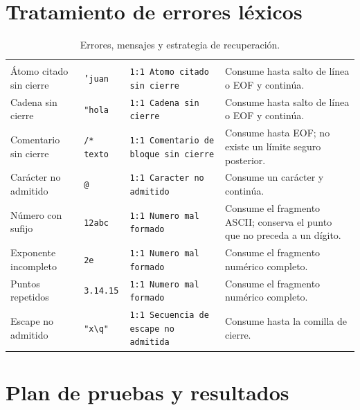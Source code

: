 \section{Tratamiento de errores léxicos}

\begin{longtable}{L{3.2cm}L{2.3cm}L{4.7cm}L{4.5cm}}
\caption{Errores, mensajes y estrategia de recuperación.}\label{tab:errores}\\
\toprule
{} &  &  &  \\
\midrule
\endfirsthead
\toprule
{} &  &  &  \\
\midrule
\endhead
Átomo citado sin cierre & \texttt{'juan} & \texttt{1:1 Atomo citado sin cierre} & Consume hasta salto de línea o EOF y continúa. \\
 Cadena sin cierre & \texttt{"hola} & \texttt{1:1 Cadena sin cierre} & Consume hasta salto de línea o EOF y continúa. \\
Comentario sin cierre & \verb|/* texto| & \texttt{1:1 Comentario de bloque sin cierre} & Consume hasta EOF; no existe un límite seguro posterior. \\
 Carácter no admitido & \texttt{@} & \texttt{1:1 Caracter no admitido} & Consume un carácter y continúa. \\
Número con sufijo & \texttt{12abc} & \texttt{1:1 Numero mal formado} & Consume el fragmento ASCII; conserva el punto que no preceda a un dígito. \\
 Exponente incompleto & \texttt{2e} & \texttt{1:1 Numero mal formado} & Consume el fragmento numérico completo. \\
Puntos repetidos & \texttt{3.14.15} & \texttt{1:1 Numero mal formado} & Consume el fragmento numérico completo. \\
 Escape no admitido & \verb|"x\q"| & \texttt{1:1 Secuencia de escape no admitida} & Consume hasta la comilla de cierre. \\
\bottomrule
\end{longtable}

\section{Plan de pruebas y resultados}


